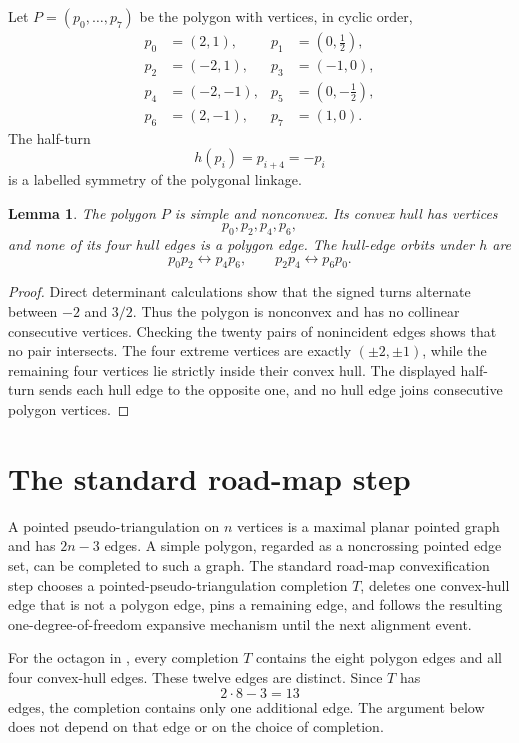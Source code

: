 \documentclass[10pt,reqno]{amsart}
\newtheorem{lemma}[theorem]{Lemma}
\theoremstyle{definition}
\begin{document}
Let \(P=(p_0,\ldots,p_7)\) be the polygon with vertices, in cyclic order,
\[
\begin{aligned}
p_0&=(2,1),             &p_1&=(0,\tfrac12),\\
p_2&=(-2,1),            &p_3&=(-1,0),\\
p_4&=(-2,-1),           &p_5&=(0,-\tfrac12),\\
p_6&=(2,-1),            &p_7&=(1,0).
\end{aligned}
\]
The half-turn
\[
 h(p_i)=p_{i+4}=-p_i
\]
is a labelled symmetry of the polygonal linkage.

\begin{lemma}\label{lem:geometry}
The polygon \(P\) is simple and nonconvex.  Its convex hull has vertices
\[
 p_0,p_2,p_4,p_6,
\]
and none of its four hull edges is a polygon edge.  The hull-edge orbits
under \(h\) are
\[
 p_0p_2\longleftrightarrow p_4p_6,
 \qquad
 p_2p_4\longleftrightarrow p_6p_0.
\]
\end{lemma}

\begin{proof}
Direct determinant calculations show that the signed turns alternate
between \(-2\) and \(3/2\).  Thus the polygon is nonconvex and has no
collinear consecutive vertices.  Checking the twenty pairs of nonincident
edges shows that no pair intersects.  The four extreme vertices are exactly
\((\pm2,\pm1)\), while the remaining four vertices lie strictly inside their
convex hull.  The displayed half-turn sends each hull edge to the opposite
one, and no hull edge joins consecutive polygon vertices.
\end{proof}

\section{The standard road-map step}

A pointed pseudo-triangulation on \(n\) vertices is a maximal planar pointed
graph and has \(2n-3\) edges.  A simple polygon, regarded as a noncrossing
pointed edge set, can be completed to such a graph.  The standard road-map
convexification step chooses a pointed-pseudo-triangulation completion
\(T\), deletes one convex-hull edge that is not a polygon edge, pins a
remaining edge, and follows the resulting one-degree-of-freedom expansive
mechanism until the next alignment event.

For the octagon in , every completion \(T\) contains the
eight polygon edges and all four convex-hull edges.  These twelve edges are
distinct.  Since \(T\) has
\[
 2\cdot8-3=13
\]
edges, the completion contains only one additional edge.  The argument below
does not depend on that edge or on the choice of completion.
\end{document}

